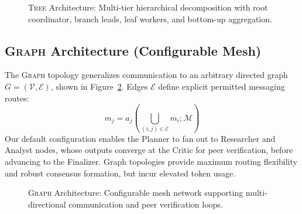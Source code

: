 \begin{figure}[h]
\centering

\caption{\textsc{Tree} Architecture: Multi-tier hierarchical decomposition with root coordinator, branch leads, leaf workers, and bottom-up aggregation.}
\label{fig:tree_topology}
\end{figure}

\subsection{\textsc{Graph} Architecture (Configurable Mesh)}
The \textsc{Graph} topology generalizes communication to an arbitrary directed graph $G = (\mathcal{V}, \mathcal{E})$, shown in Figure~\ref{fig:graph_topology}. Edges $\mathcal{E}$ define explicit permitted messaging routes:
\begin{equation}
m_{j} = a_j\left(\bigcup_{(i, j) \in \mathcal{E}} m_{i}; \mathcal{M}\right)
\end{equation}
Our default configuration enables the Planner to fan out to Researcher and Analyst nodes, whose outputs converge at the Critic for peer verification, before advancing to the Finalizer. Graph topologies provide maximum routing flexibility and robust consensus formation, but incur elevated token usage.

\begin{figure}[h]
\centering

\caption{\textsc{Graph} Architecture: Configurable mesh network supporting multi-directional communication and peer verification loops.}
\label{fig:graph_topology}
\end{figure}


